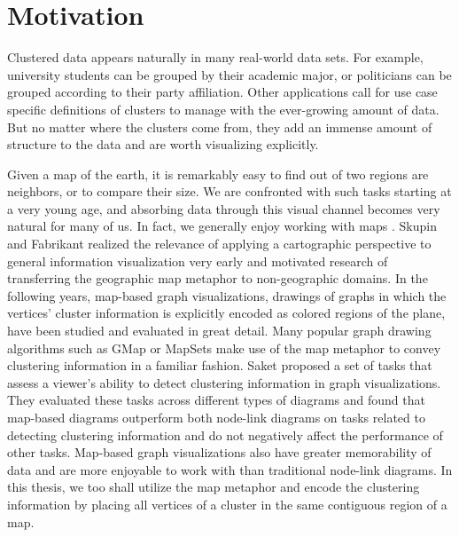 \section{Motivation}
\label{sect:motivation}

Clustered data appears naturally in many real-world data sets. For example, university students can be grouped by their academic major, or politicians can be grouped according to their party affiliation. Other applications call for use case specific definitions of clusters to manage with the ever-growing amount of data. But no matter where the clusters come from, they add an immense amount of structure to the data and are worth visualizing explicitly.

Given a map of the earth, it is remarkably easy to find out of two regions are neighbors, or to compare their size. We are confronted with such tasks starting at a very young age, and absorbing data through this visual channel becomes very natural for many of us. In fact, we generally enjoy working with maps \cite{saket2016comparing}. Skupin and Fabrikant \cite{skupin2003spatialization} realized the relevance of applying a cartographic perspective to general information visualization very early and motivated research of transferring the geographic map metaphor to non-geographic domains. In the following years, map-based graph visualizations, \ie{} drawings of graphs in which the vertices' cluster information is explicitly encoded as colored regions of the plane, have been studied and evaluated in great detail. Many popular graph drawing algorithms such as GMap \cite{gansner2009gmap} or MapSets \cite{efrat2014mapsets} make use of the map metaphor to convey clustering information in a familiar fashion. Saket \etal{} \cite{saket2014group} proposed a set of tasks that assess a viewer's ability to detect clustering information in graph visualizations. They evaluated these tasks across different types of diagrams \cite{saket2014node} and found that map-based diagrams outperform both node-link diagrams on tasks related to detecting clustering information and do not negatively affect the performance of other tasks. Map-based graph visualizations also have greater memorability of data \cite{saket2015map} and are more enjoyable to work with \cite{saket2016comparing} than traditional node-link diagrams. In this thesis, we too shall utilize the map metaphor and encode the clustering information by placing all vertices of a cluster in the same contiguous region of a map.

